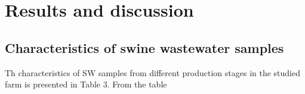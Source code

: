 \section{Results and discussion}
\subsection{Characteristics of swine wastewater samples}
Th characteristics of SW samples from different production stages in the studied farm is presented in Table 3. From the table